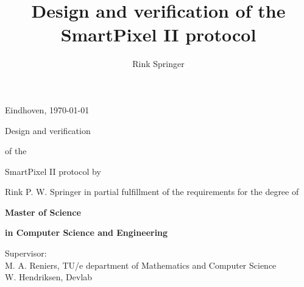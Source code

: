 \documentclass{book}
\title{Design and verification of the SmartPixel II protocol}
\author{Rink Springer}
\begin{document}
\begin{titlepage}
\hfill Eindhoven, \today
\null\vfill
\vspace{20mm}
\begin{center}\Large
\hspace{2cm}Design and verification \par
\hspace{2cm} of the \par
\hspace{2cm}SmartPixel II protocol\vskip1cm
\hspace{2cm}\normalsize by \par \hspace{2cm}Rink P. W. Springer
\vskip3cm
\hspace{2cm}in partial fulfillment of the requirements for the degree of\par
\vskip5mm
\hspace{2cm}\textbf{Master of Science}\par
\hspace{2cm}\textbf{in Computer Science and Engineering}
\vskip3cm
\end{center}\vfill
Supervisor:\\
M. A. Reniers, TU/e department of Mathematics and Computer Science\\
W. Hendriksen, Devlab \\
\end{titlepage}

\frontmatter





\tableofcontents

\mainmatter














\appendix






\end{document}

